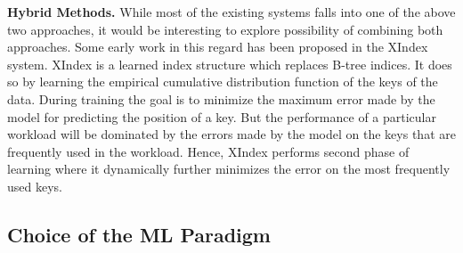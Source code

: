\vspace{2mm}
\noindent \textbf{Hybrid Methods.} While most of the existing systems falls into one of the above two approaches, it would be interesting to explore possibility of combining both approaches.
Some early work in this regard has been proposed in the XIndex~\cite{xindex} system.
XIndex is a learned index structure which replaces B-tree indices.
It does so by learning the empirical cumulative distribution function of the keys of the data.
During training the goal is to minimize the maximum error made by the model for predicting the position of a key.
But the performance of a particular workload will be dominated by the errors made by the model on the keys that are frequently used in the workload.
Hence, XIndex performs second phase of learning where it dynamically further minimizes the error on the most frequently used keys.


\subsection{Choice of the ML Paradigm}
